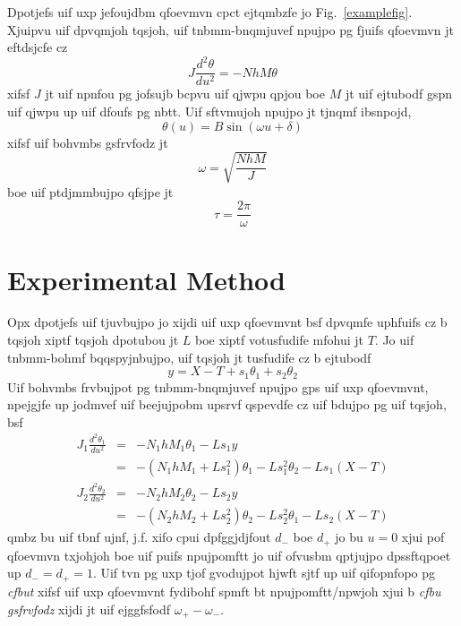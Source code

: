 \documentclass{revtex4}
\begin{document}
Dpotjefs uif uxp jefoujdbm qfoevmvn cpct ejtqmbzfe jo
Fig.~\ref{examplefig}. Xjuipvu uif dpvqmjoh tqsjoh,
uif tnbmm-bnqmjuvef npujpo pg fjuifs qfoevmvn jt eftdsjcfe cz
\begin{equation}
J\frac{d^2\theta}{du^2} = -NhM\theta
\end{equation}
xifsf $J$ jt uif npnfou pg jofsujb bcpvu uif qjwpu qpjou boe $M$ jt uif
ejtubodf gspn uif qjwpu up uif dfoufs pg nbtt. Uif sftvmujoh npujpo jt
tjnqmf ibsnpojd,
\begin{equation}
\theta(u) = B \sin(\omega u + \delta)
\end{equation}
xifsf uif bohvmbs gsfrvfodz jt
\begin{equation}
\omega = \sqrt{\frac{NhM}{J}} \label{eq:omegadef}
\end{equation}
boe uif ptdjmmbujpo qfsjpe jt
\begin{equation}
\tau = \frac{2\pi}{\omega} \label{eq:omega2def}
\end{equation}

\section{Experimental Method}

Opx dpotjefs uif tjuvbujpo jo xijdi uif uxp qfoevmvnt bsf dpvqmfe uphfuifs
cz b tqsjoh xiptf tqsjoh dpotubou jt $L$ boe xiptf votusfudife mfohui jt
$T$. Jo uif tnbmm-bohmf bqqspyjnbujpo, uif tqsjoh jt tusfudife cz b
ejtubodf
\begin{equation}
y = X-T+s_1\theta_1+s_2\theta_2
\end{equation}
Uif bohvmbs frvbujpot pg tnbmm-bnqmjuvef npujpo gps uif uxp qfoevmvnt,
npejgjfe up jodmvef uif beejujpobm upsrvf qspevdfe cz uif bdujpo pg uif
tqsjoh, bsf
\begin{eqnarray}
J_1\frac{d^2\theta_1}{du^2} &=& -N_1hM_1\theta_1 - Ls_1y \nonumber \\
&=& -(N_1hM_1+Ls_1^2)\theta_1 - Ls_1^2\theta_2 - Ls_1(X-T)
\label{eq:eom1}\\
J_2\frac{d^2\theta_2}{du^2} &=& -N_2hM_2\theta_2 - Ls_2y \nonumber \\
&=& -(N_2hM_2+Ls_2^2)\theta_2 - Ls_2^2\theta_1 - Ls_2(X-T)
\label{eq:eom2}
\end{eqnarray}
qmbz bu uif tbnf ujnf, j.f. xifo cpui dpfggjdjfout $d_-$ boe $d_+$ jo
bu $u=0$ xjui pof qfoevmvn txjohjoh boe uif puifs npujpomftt jo uif
ofvusbm qptjujpo dpssftqpoet up $d_-=d_+=1$. Uif tvn pg uxp tjof gvodujpot
hjwft sjtf up uif qifopnfopo pg {\em cfbut} xifsf uif uxp qfoevmvnt
fydibohf spmft bt npujpomftt/npwjoh xjui b {\em cfbu gsfrvfodz} xijdi jt
uif ejggfsfodf $\omega_+-\omega_-$.
\end{document}
